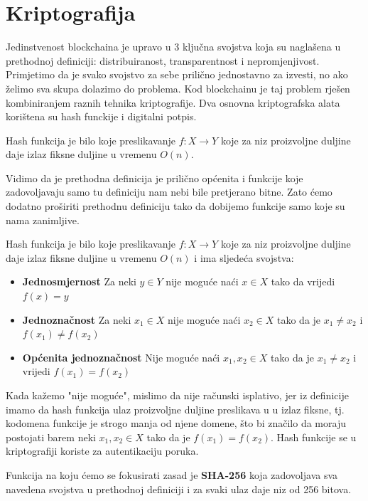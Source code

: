 \documentclass[12pt]{report}
\begin{document}
\section{Kriptografija}
Jedinstvenost blockchaina je upravo u 3 ključna svojstva koja su naglašena u prethodnoj definiciji: distribuiranost, transparentnost i nepromjenjivost. Primjetimo da je svako svojstvo za sebe prilično jednostavno za izvesti, no ako želimo sva skupa dolazimo do problema. Kod blockchainu je taj problem rješen kombiniranjem raznih tehnika kriptografije. Dva osnovna kriptografska alata korištena su hash funckije i digitalni potpis. 

\begin{definicija} 
Hash funkcija je bilo koje preslikavanje $f\colon X \to Y$ koje za niz proizvoljne duljine daje izlaz fiksne duljine u vremenu $O(n)$. 
\end{definicija}

Vidimo da je prethodna definicija je prilično općenita i funkcije koje zadovoljavaju samo tu definiciju nam nebi bile pretjerano bitne. Zato ćemo dodatno proširiti prethodnu definiciju tako da dobijemo funkcije samo koje su nama zanimljive.

\begin{definicija}
Hash funkcija je bilo koje preslikavanje $f\colon X \to Y$ koje za niz proizvoljne duljine daje izlaz fiksne duljine u vremenu $O(n)$ i ima sljedeća svojstva:
\begin{itemize}
    \item \textbf{Jednosmjernost} Za neki $y \in Y$ nije moguće naći $x \in X$ tako da vrijedi $f(x)=y$
    \item \textbf{Jednoznačnost} Za neki $x_{1} \in X$ nije moguće naći $x_{2} \in X$ tako da je $x_{1}\not=x_{2}$ i $f(x_{1}) \not= f(x_{2})$
    \item \textbf{Općenita jednoznačnost} Nije moguće naći $x_{1}, x_{2} \in X$ tako da je $x_{1} \not= x_{2}$ i vrijedi $f(x_{1}) = f(x_{2})$
\end{itemize}
\end{definicija}

Kada kažemo "nije moguće", mislimo da nije računski isplativo, jer iz definicije imamo da hash funkcija ulaz proizvoljne duljine preslikava u u izlaz fiksne, tj. kodomena funkcije je strogo manja od njene domene, što bi značilo da moraju postojati barem neki $x_{1}, x_{2} \in X$ tako da je $f(x_{1}) = f(x_{2})$. Hash funkcije se u kriptografiji koriste za autentikaciju poruka. 

Funkcija na koju ćemo se fokusirati zasad je \textbf{SHA-256} koja zadovoljava sva navedena svojstva u prethodnoj definiciji i za svaki ulaz daje niz od 256 bitova.
\end{document}
